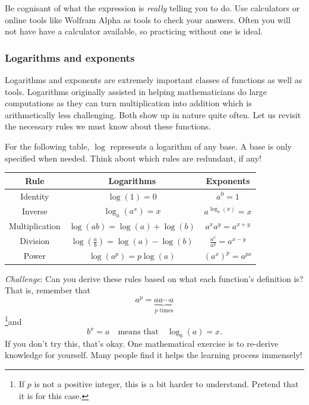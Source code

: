     Be cognisant of what the expression is \emph{really} telling you to do.  Use calculators or online tools like Wolfram Alpha as tools to check your answers. Often you will not have have a calculator available, so practicing without one is ideal.

    \subsubsection{Logarithms and exponents}

    Logarithms and exponents are extremely important classes of functions as well as tools.  Logarithms originally assisted in helping mathematicians do large computations as they can turn multiplication into addition which is arithmetically less challenging.  Both show up in nature quite often.  Let us revisit the necessary rules we must know about these functions.

    For the following table, $\log$ represents a logarithm of any base.  A base is only specified when needed. Think about which rules are redundant, if any!
    \begin{table}[H]
        \centering
        \renewcommand{\arraystretch}{1.5}
        \begin{tabular}{c|c|c}
            Rule & Logarithms & Exponents\\
            \hline
            Identity & $\log(1)=0$ & $a^0=1$\\
            \hline
            Inverse & $\log_a\left(a^x\right)=x$ & $a^{\log_a(x)}=x$\\
            \hline
            Multiplication & $\log(ab)=\log(a)+\log(b)$ & $a^x a^y=a^{x+y}$ \\
            \hline
            Division & $\log\left(\frac{a}{b}\right)=\log(a)-\log(b)$ & $\frac{a^x}{a^y}=a^{x-y}$\\
            \hline
            Power & $\log(a^p)=p\log(a)$ & $\left(a^x\right)^p = a^{px}$
        \end{tabular}
        \label{tab:log_exp_rules}
    \end{table}
    \emph{Challenge}: Can you derive these rules based on what each function's definition is? That is, remember that
    \[
    a^p = \underbrace{aa\cdots a}_{p \textrm{~times}}
    \]
    \footnote{If $p$ is not a positive integer, this is a bit harder to understand. Pretend that it is for this case.}and
    \[
    b^x = a \quad \textrm{means that} \quad \log_b(a)=x.
    \]
    If you don't try this, that's okay.  One mathematical exercise is to re-derive knowledge for yourself. Many people find it helps the learning process immensely!

